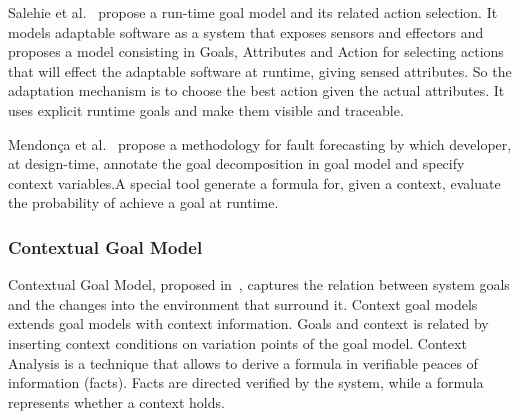 Salehie et al.~\cite{salehie_towards_2012} propose a run-time goal model and its related action selection. It models adaptable software as a system that exposes sensors and effectors and  proposes a model consisting in Goals, Attributes and Action for selecting actions that will effect the adaptable software at runtime, giving sensed attributes.
So the adaptation mechanism is to choose the best action given the actual attributes.
It uses explicit runtime goals and make them visible and traceable.

Mendonça et al.~\cite{mendonca_dependability_2015} propose a methodology for fault forecasting by which developer, at design-time, annotate the goal decomposition in goal model and specify context variables.A special tool generate a formula for, given a context, evaluate the probability of achieve a goal at runtime.

\subsubsection{Contextual Goal Model}

Contextual Goal Model, proposed in~\cite{ali_goal-based_2010}, captures the relation between system goals and the changes into the environment that surround it. Context goal models extends goal models with context information. Goals and context is related by inserting context conditions on variation points of the goal model. Context Analysis is a technique that allows to derive a formula in verifiable peaces of information (facts). Facts are directed verified by the system, while a formula represents whether a context holds.
